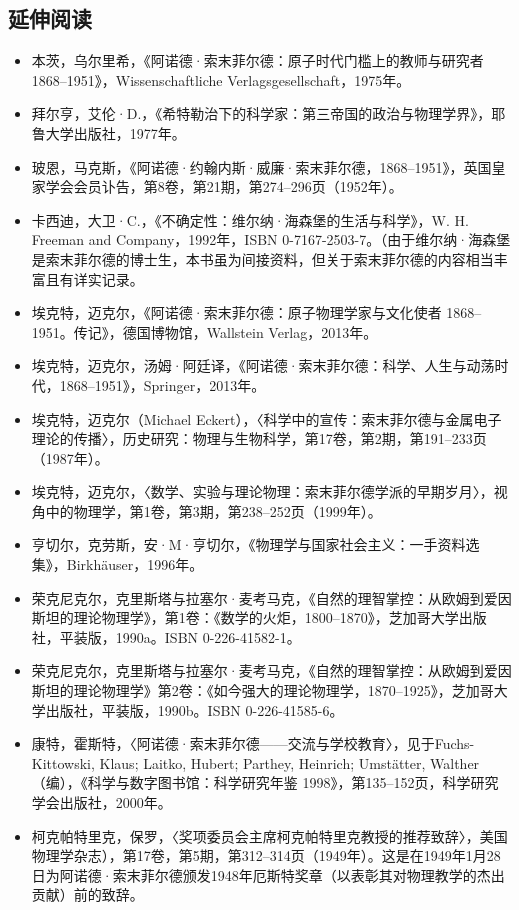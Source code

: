 \subsection{延伸阅读}
\begin{itemize}
\item 本茨，乌尔里希，《阿诺德·索末菲尔德：原子时代门槛上的教师与研究者 1868–1951》，Wissenschaftliche Verlagsgesellschaft，1975年。
\item 拜尔亨，艾伦·D.，《希特勒治下的科学家：第三帝国的政治与物理学界》，耶鲁大学出版社，1977年。
\item 玻恩，马克斯，《阿诺德·约翰内斯·威廉·索末菲尔德，1868–1951》，英国皇家学会会员讣告，第8卷，第21期，第274–296页（1952年）。
\item 卡西迪，大卫·C.，《不确定性：维尔纳·海森堡的生活与科学》，W. H. Freeman and Company，1992年，ISBN 0-7167-2503-7。（由于维尔纳·海森堡是索末菲尔德的博士生，本书虽为间接资料，但关于索末菲尔德的内容相当丰富且有详实记录。
\item 埃克特，迈克尔，《阿诺德·索末菲尔德：原子物理学家与文化使者 1868–1951。传记》，德国博物馆，Wallstein Verlag，2013年。
\item 埃克特，迈克尔，汤姆·阿廷译，《阿诺德·索末菲尔德：科学、人生与动荡时代，1868–1951》，Springer，2013年。
\item 埃克特，迈克尔（Michael Eckert），〈科学中的宣传：索末菲尔德与金属电子理论的传播〉，历史研究：物理与生物科学，第17卷，第2期，第191–233页（1987年）。
\item 埃克特，迈克尔，〈数学、实验与理论物理：索末菲尔德学派的早期岁月〉，视角中的物理学，第1卷，第3期，第238–252页（1999年）。
\item 亨切尔，克劳斯，安·M·亨切尔，《物理学与国家社会主义：一手资料选集》，Birkhäuser，1996年。
\item 荣克尼克尔，克里斯塔与拉塞尔·麦考马克，《自然的理智掌控：从欧姆到爱因斯坦的理论物理学》，第1卷：《数学的火炬，1800–1870》，芝加哥大学出版社，平装版，1990a。ISBN 0-226-41582-1。
\item 荣克尼克尔，克里斯塔与拉塞尔·麦考马克，《自然的理智掌控：从欧姆到爱因斯坦的理论物理学》第2卷：《如今强大的理论物理学，1870–1925》，芝加哥大学出版社，平装版，1990b。ISBN 0-226-41585-6。
\item 康特，霍斯特，〈阿诺德·索末菲尔德——交流与学校教育〉，见于Fuchs-Kittowski, Klaus; Laitko, Hubert; Parthey, Heinrich; Umstätter, Walther（编），《科学与数字图书馆：科学研究年鉴 1998》，第135–152页，科学研究学会出版社，2000年。
\item 柯克帕特里克，保罗，〈奖项委员会主席柯克帕特里克教授的推荐致辞〉，美国物理学杂志），第17卷，第5期，第312–314页（1949年）。这是在1949年1月28日为阿诺德·索末菲尔德颁发1948年厄斯特奖章（以表彰其对物理教学的杰出贡献）前的致辞。

\end{itemize}
